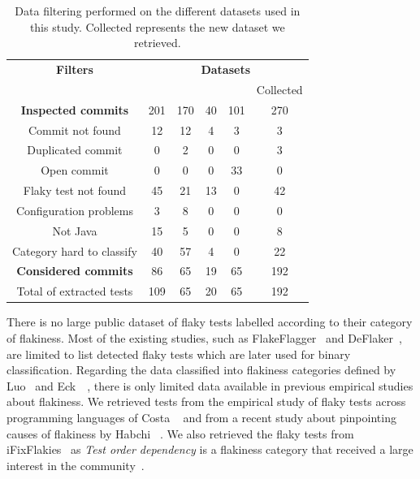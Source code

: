 \begin{table}[htbp]
\centering
\caption{Data filtering performed on the different datasets used in this study. Collected represents the new dataset we retrieved.}
\begin{tabular}{|c|c|c|c|c|c|}
\hline 
\textbf{ Filters}&\multicolumn{5}{|c|}{\textbf{Datasets}} \\
\cline{2-6} 
\textbf{} &  \cite{Luo2014} & \cite{across_pr} & \cite{habchi2022made} & \cite{Shi2019iFix} & Collected \\
\hline 
\textbf{Inspected commits} & 201 & 170 & 40 & 101 & 270\\
\hline 
 Commit not found  & 12 & 12 & 4 & 3 & 3\\
\hline
 Duplicated commit & 0 & 2 & 0 & 0 & 3 \\
\hline 
 Open commit & 0 & 0 & 0 & 33 & 0 \\
\hline
Flaky test not found & 45 & 21 & 13 & 0 & 42 \\
\hline 
Configuration problems & 3 & 8 & 0 & 0 & 0\\
\hline
Not Java & 15 & 5 & 0 & 0 & 8 \\
\hline 
Category hard to classify & 40 & 57 & 4 & 0 & 22 \\
\hline 
\textbf{Considered commits} & 86 & 65 & 19 &  65 & 192\\
\hline 
\rowcolor{Gray}
Total of extracted tests & 109 & 65 & 20  & 65 & 192\\
\hline
\end{tabular}
\label{tab:filtring_datasets}
\end{table}
\vspace{3mm}


There is no large public dataset of flaky tests labelled according to their category of flakiness. Most of the existing studies, such as FlakeFlagger~\cite{FlakeFlagger} and DeFlaker~\cite{deflaker}, are limited to list detected flaky tests which are later used for binary classification. 
Regarding the data classified into flakiness categories defined by Luo~\etal \cite{Luo2014} and Eck~\etal~\cite{eck}, there is only limited data available in previous empirical studies about flakiness. We retrieved tests from the empirical study of flaky tests across programming languages of Costa \etal~\cite{across_pr} and from a recent study about pinpointing causes of flakiness by Habchi \etal~\cite{habchi2022made}. We also retrieved the flaky tests from iFixFlakies~\cite{Shi2019iFix} as \textit{Test order dependency} is a flakiness category that received a large interest in the community~\cite{li2022evolution,Lam2019iDFlakies,li2022repairing,parry2022evaluating}.


